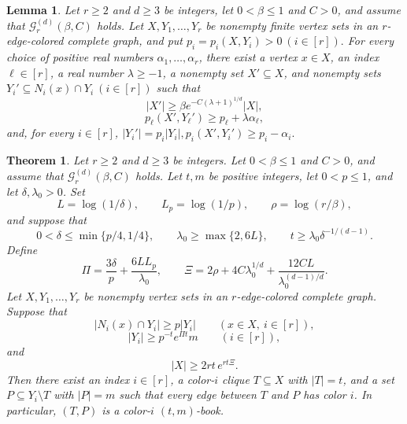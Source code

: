\documentclass[10pt,a4paper]{amsart}
\newtheorem{lemma}{Lemma}
\newtheorem{theorem}{Theorem}
\begin{document}
\begin{lemma}\label{lem:key}
Let $r\ge2$ and $d\ge3$ be integers, let $0<\beta\le1$ and $C>0$, and
assume that $\mathcal G_r^{(d)}(\beta,C)$ holds. Let
$X,Y_1,\ldots,Y_r$ be nonempty finite vertex sets in an $r$-edge-colored
complete graph, and put
$
 p_i=p_i(X,Y_i)>0
~(i\in[r]).
$
For every choice of positive real numbers $\alpha_1,\ldots,\alpha_r$, there
exist a vertex $x\in X$, an index $\ell\in[r]$, a real number
$\lambda\ge-1$, a nonempty set $X'\subseteq X$, and nonempty sets
$
 Y_i'\subseteq N_i(x)\cap Y_i
~(i\in[r])
$
such that
\begin{equation}\label{eq:key-X}
 |X'|\ge\beta e^{-C(\lambda+1)^{1/d}}|X|,
\end{equation}
\begin{equation}\label{eq:key-selected}
 p_\ell(X',Y_\ell')\ge p_\ell+\lambda\alpha_\ell,
\end{equation}
and, for every $i\in[r]$,
$
 |Y_i'|=p_i|Y_i|,
 p_i(X',Y_i')\ge p_i-\alpha_i.
$
\end{lemma}

\begin{theorem}\label{thm:book}
Let $r\ge2$ and $d\ge3$ be integers. Let $0<\beta\le1$ and $C>0$, and
assume that $\mathcal G_r^{(d)}(\beta,C)$ holds. Let $t,m$ be positive
integers, let $0<p\le1$, and let $\delta,\lambda_0>0$. Set
\[
 L=\log(1/\delta),
 \qquad
 L_p=\log(1/p),
 \qquad
 \rho=\log(r/\beta),
\]
and suppose that
\[
 0<\delta\le\min\{p/4,1/4\},
 \qquad
 \lambda_0\ge\max\{2,6L\},
 \qquad
 t\ge\lambda_0\delta^{-1/(d-1)}.
\]
Define
\[
 \Pi=\frac{3\delta}{p}+\frac{6LL_p}{\lambda_0},
 \qquad
 \Xi=2\rho+4C\lambda_0^{1/d}
      +\frac{12CL}{\lambda_0^{(d-1)/d}}.
\]
Let $X,Y_1,\ldots,Y_r$ be nonempty vertex sets in an $r$-edge-colored
complete graph. Suppose that
\begin{equation}\label{eq:book-density-hyp}
 |N_i(x)\cap Y_i|\ge p|Y_i|
 \qquad(x\in X,\ i\in[r]),
\end{equation}
\begin{equation}\label{eq:book-page-hyp}
 |Y_i|\ge p^{-t}e^{\Pi t}m
 \qquad(i\in[r]),
\end{equation}
and
\begin{equation}\label{eq:book-reservoir-hyp}
 |X|\ge2rt\,e^{rt\Xi}.
\end{equation}
Then there exist an index $i\in[r]$, a color-$i$ clique $T\subseteq X$
with $|T|=t$, and a set $P\subseteq Y_i\setminus T$ with $|P|=m$ such
that every edge between $T$ and $P$ has color $i$. In particular, $(T,P)$
is a color-$i$ $(t,m)$-book.
\end{theorem}
\end{document}
